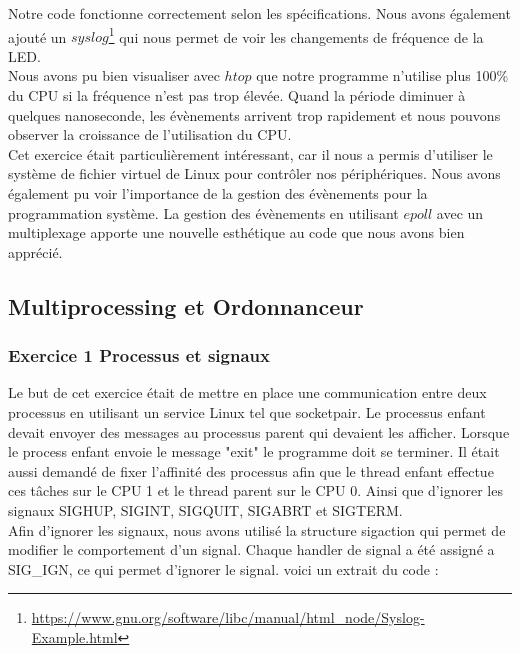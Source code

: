 \documentclass[
	a4paper, %
	10pt, %
]{CSUniSchoolLabReport}
\begin{document}
Notre code fonctionne correctement selon les spécifications. Nous avons également ajouté un $syslog$\footnote{\href{https://www.gnu.org/software/libc/manual/html_node/Syslog-Example.html}{https://www.gnu.org/software/libc/manual/html\_node/Syslog-Example.html}} qui nous permet de voir les changements de fréquence de la LED.\\
Nous avons pu bien visualiser avec $htop$ que notre programme n'utilise plus 100\% du CPU si la fréquence n'est pas trop élevée. Quand la période diminuer à quelques nanoseconde, les évènements arrivent trop rapidement et nous pouvons observer la croissance de l'utilisation du CPU.\\
Cet exercice était particulièrement intéressant, car il nous a permis d'utiliser le système de fichier virtuel de Linux pour contrôler nos périphériques. Nous avons également pu voir l'importance de la gestion des évènements pour la programmation système. La gestion des évènements en utilisant $epoll$ avec un multiplexage apporte une nouvelle esthétique au code que nous avons bien apprécié.

\subsection{Multiprocessing et Ordonnanceur}\label{multiprocess}
\subsubsection{Exercice 1 Processus et signaux}\label{MPEx1}
Le but de cet exercice \'etait de mettre en place une communication entre deux processus en utilisant un service Linux tel que socketpair.
Le processus enfant devait envoyer des messages au processus parent qui devaient les afficher. Lorsque le process enfant envoie le message "exit" le programme doit se terminer.
Il \'etait aussi demand\'e de fixer l'affinité des processus afin que le thread enfant effectue ces t\^aches sur le CPU 1 et le thread parent sur le CPU 0.
Ainsi que d'ignorer les signaux SIGHUP, SIGINT, SIGQUIT, SIGABRT et SIGTERM.\\

Afin d'ignorer les signaux, nous avons utilis\'e la structure sigaction qui permet de modifier le comportement d'un signal.
Chaque handler de signal a été assigné a SIG\_IGN, ce qui permet d'ignorer le signal.
voici un extrait du code :
\end{document}
